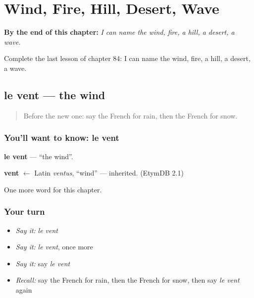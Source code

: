 
\chapter{Wind, Fire, Hill, Desert, Wave}
\label{ch:fr-wind-fire-hill-desert-wave}

\begin{chapteropening}
\textbf{By the end of this chapter:} \emph{I can name the wind, fire, a hill, a desert, a wave.}

Complete the last lesson of chapter 84: I can name the wind, fire, a hill, a desert, a wave.
\end{chapteropening}

\section[le vent]{le vent — the wind}

\label{lesson:FR-C84-vent}



\begin{quote}
Before the new one: say the French for rain, then the French for snow.
\end{quote}

\subsection*{You'll want to know: le vent}
\textbf{le vent} — \textquotedblleft{}the wind\textquotedblright{}.

\begin{cousinweb}
\textbf{vent} $\leftarrow$ Latin \emph{ventus}, \textquotedblleft{}wind\textquotedblright{} — inherited. (EtymDB 2.1)
\end{cousinweb}

\begin{grammarlens}[title={What you've built}]
One more word for this chapter.
\end{grammarlens}

\subsection*{Your turn}
\begin{itemize}
\raggedright
  \item \emph{Say it:} \emph{le vent}
  \item \emph{Say it:} \emph{le vent}, once more
  \item \emph{Say it:} say \emph{le vent}
  \item \emph{Recall:} say the French for rain, then the French for snow, then say \emph{le vent} again
\end{itemize}

